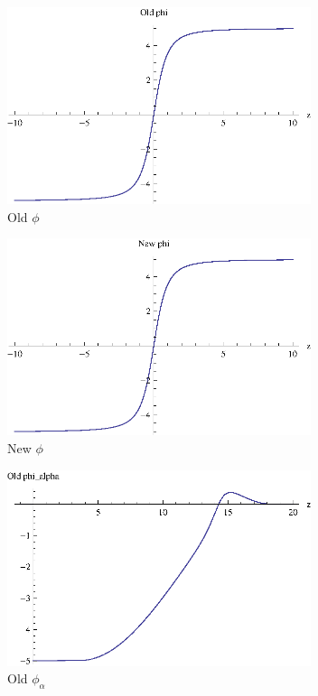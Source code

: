 \documentclass[10pt, conference, compsocconf]{IEEEtran}
\begin{document}
\begin{figure}[!b]
  \begin{center}
    \includegraphics[width=3.5in]{phiOld}
  \end{center}

  \caption{\small Old $\phi$}
  \label{fig:oldPhi}
\end{figure}

\begin{figure}[!b]
  \begin{center}
    \includegraphics[width=3.5in]{phiNew}
  \end{center}

  \caption{\small New $\phi$}
  \label{fig:newPhi}
\end{figure}

\begin{figure}[!b]
  \begin{center}
    \includegraphics[width=3.5in]{phiAlphaOld}
  \end{center}

  \caption{\small Old $\phi_{\alpha}$}
  \label{fig:oldPhiAlpha}
\end{figure}
\end{document}
